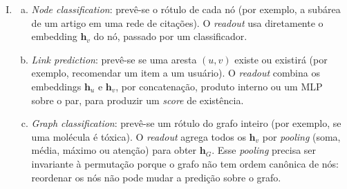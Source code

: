 \documentclass{dlproblemset}
\begin{document}
\begin{enumerate}[I)]
\begin{enumerate}[(a)]
\[        \]
        \item Aplicando a $\mathbf{h}^{(0)} = (2,4,6)^\top$:
        \begin{align*}
            h^{(1)}_1 &\approx 0{,}50 \cdot 2 + 0{,}408 \cdot 4 \approx 2{,}63, \\
            h^{(1)}_2 &\approx 0{,}408 \cdot 2 + 0{,}333 \cdot 4 + 0{,}408 \cdot 6 \approx 4{,}60, \\
            h^{(1)}_3 &\approx 0{,}408 \cdot 4 + 0{,}50 \cdot 6 \approx 4{,}63,
        \end{align*}
        ou seja, $\mathbf{h}^{(1)} \approx (2{,}63,\, 4{,}60,\, 4{,}63)^\top$. O nó central $2$ recebe contribuições dos três valores ($1$, $3$ e ele próprio), com peso menor sobre si mesmo por ter grau maior, enquanto as pontas $1$ e $3$ agregam apenas dois valores com peso $0{,}50$ sobre si, o que explica a diferença entre o valor central e os das pontas.
    \end{enumerate}

    \item
    \begin{enumerate}[(a)]
        \item \textit{Node classification}: prevê-se o rótulo de cada nó (por exemplo, a subárea de um artigo em uma rede de citações). O \textit{readout} usa diretamente o embedding $\mathbf{h}_v$ do nó, passado por um classificador.
        \item \textit{Link prediction}: prevê-se se uma aresta $(u,v)$ existe ou existirá (por exemplo, recomendar um item a um usuário). O \textit{readout} combina os embeddings $\mathbf{h}_u$ e $\mathbf{h}_v$, por concatenação, produto interno ou um MLP sobre o par, para produzir um \textit{score} de existência.
        \item \textit{Graph classification}: prevê-se um rótulo do grafo inteiro (por exemplo, se uma molécula é tóxica). O \textit{readout} agrega todos os $\mathbf{h}_v$ por \textit{pooling} (soma, média, máximo ou atenção) para obter $\mathbf{h}_G$. Esse \textit{pooling} precisa ser invariante à permutação porque o grafo não tem ordem canônica de nós: reordenar os nós não pode mudar a predição sobre o grafo.
    \end{enumerate}


\end{enumerate}
\end{document}
